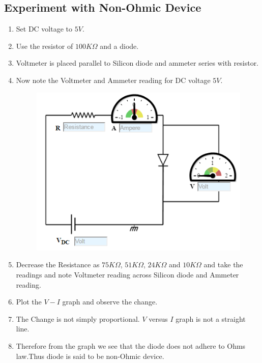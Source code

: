 		\subsection{Experiment with Non-Ohmic Device}
			\begin{enumerate}
				\tightlist
				\item
				Set DC voltage to $5V$.
				\item
				Use the resistor of $100K\Omega$ and a diode.
				\item
				Voltmeter is placed parallel to Silicon diode and ammeter series with
				resistor.
				\item
				Now note the Voltmeter and Ammeter reading for DC voltage $5V$.
				\begin{figure}[h]
					\centering
					\includegraphics[width=0.4\linewidth]{img/exp4/8}
					\caption{}
					\label{fig:exp4_4}
				\end{figure}
				\item
				Decrease the Resistance as $75K\Omega$, $51K\Omega$, $24K\Omega$ and $10K\Omega$ and take the
				readings and note Voltmeter reading across Silicon diode and Ammeter
				reading.
				\item
				Plot the $V-I$ graph and observe the change.
				\item
				The Change is not simply proportional. $V$ versus $I$ graph is not a
				straight line.
				\item
				Therefore from the graph we see that the diode does not adhere to Ohms
				law.Thus diode is said to be non-Ohmic device.
			\end{enumerate}

